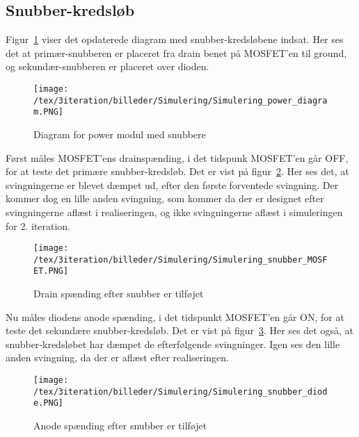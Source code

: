 
\subsection{Snubber-kredsløb}
Figur~\ref{fig:simulering_diagram_snubber_3} viser det opdaterede diagram med snubber-kredsløbene indsat. Her ses det at primær-snubberen er placeret fra drain benet på MOSFET'en til ground, og sekundær-snubberen er placeret over dioden. 
\begin{figure}[H]
	\center
	\texttt{[image: /tex/3iteration/billeder/Simulering/Simulering\_power\_diagram.PNG]}
	\caption{Diagram for power modul med snubbere}
	\label{fig:simulering_diagram_snubber_3}
\end{figure}

\noindent Først måles MOSFET'ens drainspænding, i det tidspunk MOSFET'en går OFF, for at teste det primære snubber-kredsløb. Det er vist på figur~\ref{fig:simulering_snubber_MOSFET_3}. Her ses det, at svingningerne er blevet dæmpet ud, efter den første forventede svingning. Der kommer dog en lille anden svingning, som kommer da der er designet efter svingningerne aflæst i realiseringen, og ikke svingningerne aflæst i simuleringen for 2. iteration.  

\begin{figure}[H]
	\center
	\texttt{[image: /tex/3iteration/billeder/Simulering/Simulering\_snubber\_MOSFET.PNG]}
	\caption{Drain spænding efter snubber er tilføjet}
	\label{fig:simulering_snubber_MOSFET_3}
\end{figure}

\noindent Nu måles diodens anode spænding, i det tidspunkt MOSFET'en går ON, for at teste det sekundære snubber-kredsløb. Det er vist på figur~\ref{fig:simulering_snubber_diode_3}. Her ses det også, at snubber-kredsløbet har dæmpet de efterfølgende svingninger. Igen ses den lille anden svingning, da der er aflæst efter realiseringen.

\begin{figure}[H]
	\center
	\texttt{[image: /tex/3iteration/billeder/Simulering/Simulering\_snubber\_diode.PNG]}
	\caption{Anode spænding efter snubber er tilføjet}
	\label{fig:simulering_snubber_diode_3}
\end{figure}







